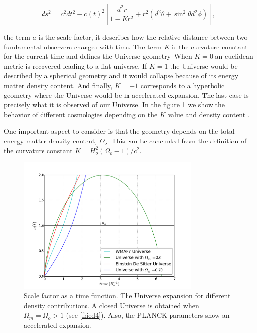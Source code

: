 \begin{equation}
ds^2= c^2dt^2-a(t)^2\left[\frac{d^2r}{1-Kr^2} +r^2(d^2\theta
 + \sin^2\theta d^2\phi )\right] ,
\label{metric}
\end{equation} 	

the term $a$ is the scale factor, it describes how the relative
distance between two fundamental observers changes with time. 
The term $K$ is the curvature constant for the current time and defines
the Universe geometry. When $K=0$ an euclidean metric is recovered 
leading to a flat universe. If $K=1$ the Universe
would be described by a spherical geometry and it would collapse because
of its energy matter density content. And finally, $K=-1$ corresponds to a
hyperbolic geometry where the Universe would be in accelerated expansion.  
The last case is precisely what it is observed of our Universe.
In the figure \ref{factor} we show the behavior of different cosmologies
depending on the $K$ value and density content \cite{Longair}. 

One important aspect to consider is that the geometry depends on the 
total energy-matter density content, $\Omega_o$. This can be concluded from
the definition of the curvature constant $K = H_o^2(\Omega_o -1)/c^2$. 



\begin{figure}[htbp]
       \centering
               \includegraphics[width=0.8\textwidth]{Images/chapter2/factordeescala.pdf}
       \caption{ \small Scale factor as a time function. The Universe expansion for 
       different density contributions. A closed Universe is obtained when 
       $\Omega_m = \Omega_o>1$ (see \ref{fried4}). Also, the PLANCK parameters show an accelerated expansion. 
        }
       \label{factor}
 \end{figure}

